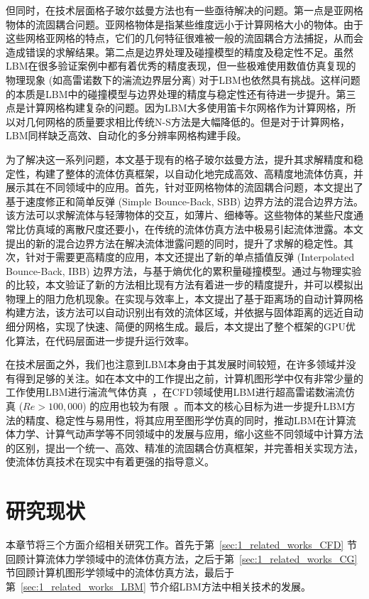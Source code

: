 但同时，在技术层面格子玻尔兹曼方法也有一些亟待解决的问题。第一点是亚网格物体的流固耦合问题。亚网格物体是指某些维度远小于计算网格大小的物体。由于这些网格亚网格的特点，它们的几何特征很难被一般的流固耦合方法捕捉，从而会造成错误的求解结果。第二点是边界处理及碰撞模型的精度及稳定性不足。虽然LBM在很多验证案例中都有着优秀的精度表现，但一些极难使用数值仿真复现的物理现象 (如高雷诺数下的湍流边界层分离) 对于LBM也依然具有挑战。这样问题的本质是LBM中的碰撞模型与边界处理的精度与稳定性还有待进一步提升。第三点是计算网格构建复杂的问题。因为LBM大多使用笛卡尔网格作为计算网格，所以对几何网格的质量要求相比传统N-S方法是大幅降低的。但是对于计算网格，LBM同样缺乏高效、自动化的多分辨率网格构建手段。

为了解决这一系列问题，本文基于现有的格子玻尔兹曼方法，提升其求解精度和稳定性，构建了整体的流体仿真框架，以自动化地完成高效、高精度地流体仿真，并展示其在不同领域中的应用。首先，针对亚网格物体的流固耦合问题，本文提出了基于速度修正和简单反弹 (Simple Bounce-Back, SBB) 边界方法的混合边界方法。该方法可以求解流体与轻薄物体的交互，如薄片、细棒等。这些物体的某些尺度通常比仿真域的离散尺度还要小，在传统的流体仿真方法中极易引起流体泄露。本文提出的新的混合边界方法在解决流体泄露问题的同时，提升了求解的稳定性。其次，针对于需要更高精度的应用，本文还提出了新的单点插值反弹 (Interpolated Bounce-Back, IBB) 边界方法，与基于熵优化的累积量碰撞模型。通过与物理实验的比较，本文验证了新的方法相比现有方法有着进一步的精度提升，并可以模拟出物理上的阻力危机现象。在实现与效率上，本文提出了基于距离场的自动计算网格构建方法，该方法可以自动识别出有效的流体区域，并依据与固体距离的远近自动细分网格，实现了快速、简便的网格生成。最后，本文提出了整个框架的GPU优化算法，在代码层面进一步提升运行效率。

在技术层面之外，我们也注意到LBM本身由于其发展时间较短，在许多领域并没有得到足够的关注。如在本文中的工作提出之前，计算机图形学中仅有非常少量的工作使用LBM进行湍流气体仿真~\citep{10.1109/TVCG.2012.303, Li-2019, Li-2020}，在CFD领域使用LBM进行超高雷诺数湍流仿真 ($Re>100,000$) 的应用也较为有限~\cite{10.1063/5.0046938}。而本文的核心目标为进一步提升LBM方法的精度、稳定性与易用性，将其应用至图形学仿真的同时，推动LBM在计算流体力学、计算气动声学等不同领域中的发展与应用，缩小这些不同领域中计算方法的区别，提出一个统一、高效、精准的流固耦合仿真框架，并完善相关实现方法，使流体仿真技术在现实中有着更强的指导意义。


\section{研究现状}
本章节将三个方面介绍相关研究工作。首先于第~\ref{sec:1_related_works_CFD} 节回顾计算流体力学领域中的流体仿真方法，之后于第~\ref{sec:1_related_works_CG} 节回顾计算机图形学领域中的流体仿真方法，最后于第~\ref{sec:1_related_works_LBM} 节介绍LBM方法中相关技术的发展。

